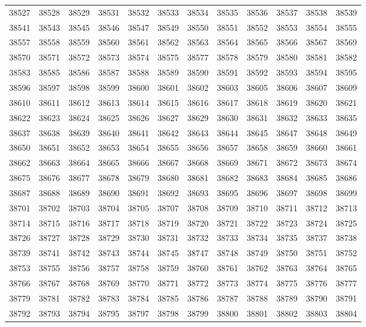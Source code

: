 \begin{center}
\begin{longtable}{llllllllllll}
38527 &38528 &38529 &38531 &38532 &38533 &38534 &38535 &38536 &38537 &38538 &38539 \\
38541 &38543 &38545 &38546 &38547 &38549 &38550 &38551 &38552 &38553 &38554 &38555 \\
38557 &38558 &38559 &38560 &38561 &38562 &38563 &38564 &38565 &38566 &38567 &38569 \\
38570 &38571 &38572 &38573 &38574 &38575 &38577 &38578 &38579 &38580 &38581 &38582 \\
38583 &38585 &38586 &38587 &38588 &38589 &38590 &38591 &38592 &38593 &38594 &38595 \\
38596 &38597 &38598 &38599 &38600 &38601 &38602 &38603 &38605 &38606 &38607 &38609 \\
38610 &38611 &38612 &38613 &38614 &38615 &38616 &38617 &38618 &38619 &38620 &38621 \\
38622 &38623 &38624 &38625 &38626 &38627 &38629 &38630 &38631 &38632 &38633 &38635 \\
38637 &38638 &38639 &38640 &38641 &38642 &38643 &38644 &38645 &38647 &38648 &38649 \\
38650 &38651 &38652 &38653 &38654 &38655 &38656 &38657 &38658 &38659 &38660 &38661 \\
38662 &38663 &38664 &38665 &38666 &38667 &38668 &38669 &38671 &38672 &38673 &38674 \\
38675 &38676 &38677 &38678 &38679 &38680 &38681 &38682 &38683 &38684 &38685 &38686 \\
38687 &38688 &38689 &38690 &38691 &38692 &38693 &38695 &38696 &38697 &38698 &38699 \\
38701 &38702 &38703 &38704 &38705 &38707 &38708 &38709 &38710 &38711 &38712 &38713 \\
38714 &38715 &38716 &38717 &38718 &38719 &38720 &38721 &38722 &38723 &38724 &38725 \\
38726 &38727 &38728 &38729 &38730 &38731 &38732 &38733 &38734 &38735 &38737 &38738 \\
38739 &38741 &38742 &38743 &38744 &38745 &38747 &38748 &38749 &38750 &38751 &38752 \\
38753 &38755 &38756 &38757 &38758 &38759 &38760 &38761 &38762 &38763 &38764 &38765 \\
38766 &38767 &38768 &38769 &38770 &38771 &38772 &38773 &38774 &38775 &38776 &38777 \\
38779 &38781 &38782 &38783 &38784 &38785 &38786 &38787 &38788 &38789 &38790 &38791 \\
38792 &38793 &38794 &38795 &38797 &38798 &38799 &38800 &38801 &38802 &38803 &38804 \\

\end{longtable}
\end{center}
